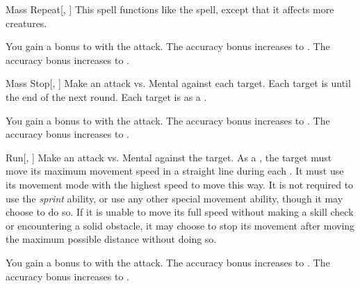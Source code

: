 \lowercase{\hypertarget{spell:Mass Repeat}{}}\label{spell:Mass Repeat}
\begin{freeability}[Rank 1]{\hypertarget{spell:Mass Repeat}{Mass Repeat}}[, ]
This spell functions like the  spell, except that it affects more creatures.

\rankline
{} You gain a  bonus to  with the attack.
 The accuracy bonus increases to .
 The accuracy bonus increases to .
\end{freeability}
\vspace{0.25em}



\lowercase{\hypertarget{spell:Mass Stop}{}}\label{spell:Mass Stop}
\begin{freeability}[Rank 1]{\hypertarget{spell:Mass Stop}{Mass Stop}}[, ]
Make an attack vs. Mental against each target.
\hit Each target is  until the end of the next round.
\crit Each target is  as a .

\rankline
{} You gain a  bonus to  with the attack.
 The accuracy bonus increases to .
 The accuracy bonus increases to .
\end{freeability}
\vspace{0.25em}



\lowercase{\hypertarget{spell:Run}{}}\label{spell:Run}
\begin{freeability}[Rank 1]{\hypertarget{spell:Run}{Run}}[, ]
Make an attack vs. Mental against the target.
\hit As a , the target must move its maximum movement speed in a straight line during each .
It must use its movement mode with the highest speed to move this way.
It is not required to use the \textit{sprint} ability, or use any other special movement ability, though it may choose to do so.
If it is unable to move its full speed without making a skill check or encountering a solid obstacle, it may choose to stop its movement after moving the maximum possible distance without doing so.

\rankline
{} You gain a  bonus to  with the attack.
 The accuracy bonus increases to .
 The accuracy bonus increases to .
\end{freeability}
\vspace{0.25em}




